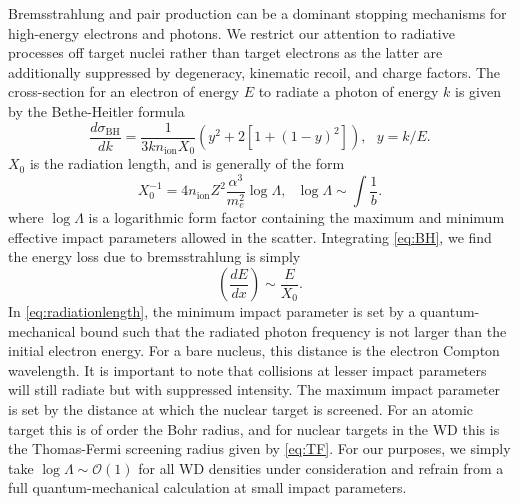 \documentclass[twocolumn, preprintnumbers,amsmath,amssymb,prd, superscriptaddress]{revtex4}
\newcommand{\OO}{\mathcal{O}}
\def\r{\right)}
\def\l{\left(}
\begin{document}
\begin{appendices}
Bremsstrahlung and pair production can be a dominant stopping mechanisms for high-energy electrons and photons.
We restrict our attention to radiative processes off target nuclei rather than target electrons as the latter are additionally suppressed by degeneracy, kinematic recoil, and charge factors.
The cross-section for an electron of energy $E$ to radiate a photon of energy $k$ is given by the Bethe-Heitler formula
\begin{equation}
\label{eq:BH}
\frac{d \sigma_\text{BH}}{dk} = \frac{1}{3 k n_\text{ion} X_0} (y^2+2 [1+ (1-y)^2]), ~~~ y = k/E.
\end{equation}
$X_0$ is the radiation length, and is generally of the form
\begin{equation}
\label{eq:radiationlength}
X_0^{-1} = 4 n_\text{ion} Z^2 \frac{\alpha^3}{m_e^2} \log{\Lambda}, ~~~ \log{\Lambda} \sim \int \frac{1}{b}.
\end{equation}
where $\log{\Lambda}$ is a logarithmic form factor containing the maximum and minimum effective impact parameters allowed in the scatter.
Integrating \eqref{eq:BH}, we find the energy loss due to bremsstrahlung is simply
\begin{equation}
\l\frac{dE}{dx}\r \sim \frac{E}{X_0}.
\end{equation}
In \eqref{eq:radiationlength}, the minimum impact parameter is set by a quantum-mechanical bound such that the radiated photon frequency is not larger than the initial electron energy.
For a bare nucleus, this distance is the electron Compton wavelength.
It is important to note that collisions at lesser impact parameters will still radiate but with suppressed intensity.
The maximum impact parameter is set by the distance at which the nuclear target is screened.
For an atomic target this is of order the Bohr radius, and for nuclear targets in the WD this is the Thomas-Fermi screening radius given by \eqref{eq:TF}.
For our purposes, we simply take $\log{\Lambda} \sim \OO(1)$ for all WD densities under consideration and refrain from a full quantum-mechanical calculation at small impact parameters.


\end{appendices}
\end{document}
